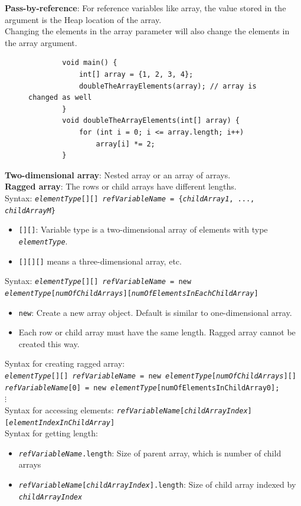\documentclass{article}
\begin{document}
\textbf{Pass-by-reference}: For reference variables like array, the value stored in the argument is the Heap location of the array.\\
Changing the elements in the array parameter will also change the elements in the array argument.

\begin{figure}[h!]
	\centering
	\begin{verbatim}
		void main() {
		    int[] array = {1, 2, 3, 4};
		    doubleTheArrayElements(array); // array is changed as well
		}
		void doubleTheArrayElements(int[] array) {
		    for (int i = 0; i <= array.length; i++)
		        array[i] *= 2;
		}
	\end{verbatim}
\end{figure}

\textbf{Two-dimensional array}: Nested array or an array of arrays.\\
\textbf{Ragged array}: The rows or child arrays have different lengths.\\
Syntax: \texttt{\textit{elementType}[][] \textit{refVariableName} = \{\textit{childArray1}, ..., \textit{childArrayM}\}}
\begin{itemize}
	\item \texttt{[][]}: Variable type is a two-dimensional array of elements with type \texttt{\textit{elementType}}.
	\item \texttt{[][][]} means a three-dimensional array, etc.
\end{itemize}
Syntax: \texttt{\textit{elementType}[][] \textit{refVariableName} = new \textit{elementType}[\textit{numOfChildArrays}][\textit{numOfElementsInEachChildArray}]}
\begin{itemize}
	\item \texttt{new}: Create a new array object. Default is similar to one-dimensional array.
	\item Each row or child array must have the same length. Ragged array cannot be created this way.
\end{itemize}
Syntax for creating ragged array:\\
\texttt{\textit{elementType}[][] \textit{refVariableName} = new \textit{elementType}[\textit{numOfChildArrays}][]\\
\textit{refVariableName}[0] = new \textit{elementType}[numOfElementsInChildArray0];\\
$\vdots$
}\\
Syntax for accessing elements: \texttt{\textit{refVariableName}[\textit{childArrayIndex}][\textit{elementIndexInChildArray}]}\\
Syntax for getting length:
\begin{itemize}
	\item \texttt{\textit{refVariableName}.length}: Size of parent array, which is number of child arrays
	\item \texttt{\textit{refVariableName}[\textit{childArrayIndex}].length}: Size of child array indexed by \texttt{\textit{childArrayIndex}}
\end{itemize}
\newpage
\end{document}
